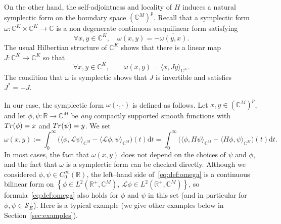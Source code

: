 \documentclass[11pt]{amsart}
\numberwithin{equation}{section} %
\newcommand\1{{\mathds 1}}
\def\C{{\mathbb C}}
\def\R{{\mathbb R}}
\def\rd{{\mathrm{d}}}
\def\cL{{\mathcal L}}
\def\cS{{\mathcal S}}
\def\bra{\langle}
\def\ket{\rangle}
\def\Tr{{\rm Tr}}
\begin{document}
\medskip

On the other hand, the self-adjointness and locality of $H$ induces a natural symplectic form on the boundary space $(\C^M)^p$. Recall that a symplectic form $\omega : \C^K \times \C^K \to \C$ is a non degenerate continuous sesquilinear form satisfying
\[
\forall x, y \in \C^K, \quad \omega(x,y) = - \overline{\omega(y,x)}.
\]
The usual Hilbertian structure of $\C^K$ shows that there is a linear map $J : \C^K \to \C^K$ so that
\begin{equation}\label{eq:defJ}
    \forall x, y \in \C^K, \qquad \omega(x, y) = \bra x, J y \ket_{\C^K}.
\end{equation}
The condition that $\omega$ is symplectic shows that $J$ is invertible and satisfies $J^* = -J$. 

\medskip

In our case, the symplectic form $\omega(\cdot, \cdot)$ is defined as follows. Let $x, y \in (\C^M)^p$, and let $\phi, \psi :  \R \to \C^M$ be {\em any} compactly supported smooth functions with $\Tr(\phi) = x$ and $\Tr(\psi) = y$. We set
\begin{equation} \label{eq:def:omega}
    \omega(x, y) := \int_0^{\infty} \Big( \bra \phi, \cL \psi \ket_{\C^M} - \bra \cL \phi,  \psi \ket_{\C^M} \Big)(t) \rd t
    = \int_0^{\infty} \Big( \bra \phi, H \psi \ket_{\C^M} - \bra H \phi,  \psi \ket_{\C^M} \Big)(t) \rd t.
\end{equation}
In most cases, the fact that $\omega(x, y)$ does not depend on the choices of $\psi$ and $\phi$, and the fact that $\omega$ is a symplectic form can be checked directly. Although we considered $\phi, \psi \in C^\infty_0(\R)$, the left--hand side of~\eqref{eq:def:omega} is a continuous bilinear form on $\left\{ \phi \in L^2(\R^+, \C^M), \ \cL \phi \in L^2(\R^+, \C^M)\right\}$, so formula~\eqref{eq:def:omega} also holds for $\phi$ and $\psi$ in this set (and in particular for $\phi, \psi \in \cS_E^+$). Here is a typical example (we give other examples below in Section~\ref{sec:examples}).
\end{document}

